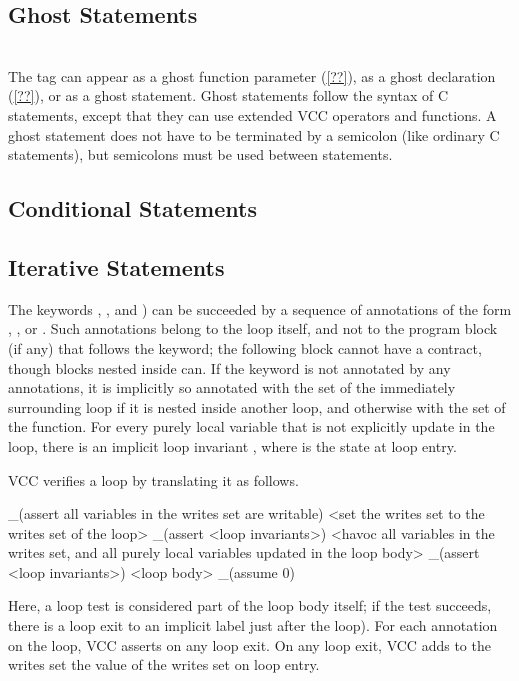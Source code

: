 \documentclass[preprint,nocopyrightspace]{sigplanconf}
\begin{document}
{{{\subsection{Ghost Statements}
\\
The tag  can appear as a ghost function parameter
(\ref{??}), as a ghost declaration (\ref{??}), or as a ghost
statement. Ghost statements follow the syntax of C statements, except
that they can use extended VCC operators and functions. A ghost
statement does not have to be terminated by a semicolon (like ordinary
C statements), but semicolons must be used between statements.

\subsection{Conditional Statements}

\subsection{Iterative Statements}
The keywords , , and ) 
can be succeeded by a sequence of annotations of the form 
, , or 
. Such annotations belong to the loop itself, and
not to the program block (if any) that follows the keyword; the
following block cannot have a contract, though blocks nested inside
can. If the keyword is not annotated by any  annotations,
it is implicitly so annotated with the  set of the
immediately surrounding loop if it is nested inside another loop, and
otherwise with the  set of the function. For every
purely local variable  that is not explicitly update in the
loop, there is an implicit loop invariant ,
where  is the state at loop entry.

VCC verifies a loop by translating it as follows. 

\begin{VCC}
_(assert all variables in the writes set are writable)
<set the writes set to the writes set of the loop>
_(assert <loop invariants>)
<havoc all variables in the writes set, and all purely local variables
 updated in the loop body>
_(assert <loop invariants>)
<loop body>
_(assume 0)

\end{VCC}

Here, a loop test is considered part of the loop body itself; if the
test succeeds, there is a loop exit to an implicit label just after the
loop). For each annotation  on the loop, VCC asserts 
 on any loop exit. On any loop exit, VCC adds to the writes set
the value of the writes set on loop entry.

}}}
\end{document}
